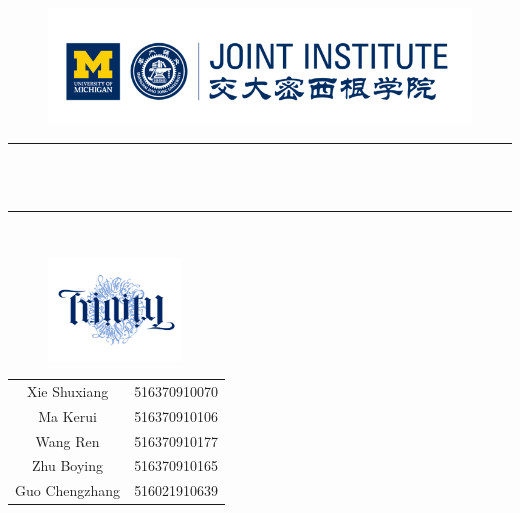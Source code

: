 

\begin{figure}[H]
    \centering
    \includegraphics[width=5.3in]{Pics/JILOGO}
\end{figure}

\begin{center}
{\rule{11cm}{0.01cm} \\ \tiny~
\\ \large {}
\rule{11cm}{0.01cm}  
\\  \large{}}
\end{center}

\begin{figure}[H]
    \centering
    \includegraphics[width=1.4in]{Pics/Logo}
\end{figure}

\normalsize
\begin{center}
\begin{tabular}{cl}
\large
\vspace{0.3em} Xie Shuxiang&516370910070\vspace{0.3em}\\ 
\large
Ma Kerui\vspace{0.3em} &516370910106 \vspace{0.3em}\\ 
\large
Wang Ren\vspace{0.3em} &516370910177 \vspace{0.3em}\\ 
\large
Zhu Boying\vspace{0.3em} &516370910165 \vspace{0.3em}\\ 
\large
Guo Chengzhang\vspace{0.3em} &516021910639 \vspace{0.3em}\\ 
 
\end{tabular}
\end{center}

